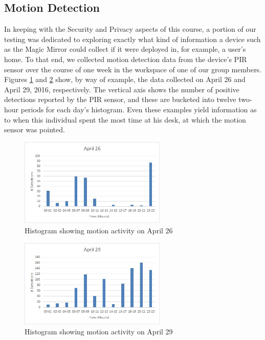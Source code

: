 \documentclass[conference]{IEEEtran}
\begin{document}
\subsection{Motion Detection}
In keeping with the Security and Privacy aspects of this course, a portion of our testing was dedicated to exploring exactly what kind of information a device such as the Magic Mirror could collect if it were deployed in, for example, a user's home.
To that end, we collected motion detection data from the device's PIR sensor over the course of one week in the workspace of one of our group members.
Figures \ref{fig:chart26} and \ref{fig:chart29} show, by way of example, the data collected on April 26 and April 29, 2016, respectively.
The vertical axis shows the number of positive detections reported by the PIR sensor, and these are bucketed into twelve two-hour periods for each day's histogram.
Even these examples yield information as to when this individual spent the most time at his desk, at which the motion sensor was pointed.
\begin{figure}[!ht]
\centering
\includegraphics[width=2.75in]{images/Chart-April26.jpg}
\caption{Histogram showing motion activity on April 26}
\label{fig:chart26}
\end{figure}

\begin{figure}[!ht]
\centering
\includegraphics[width=2.75in]{images/Chart-April29.jpg}
\caption{Histogram showing motion activity on April 29}
\label{fig:chart29}
\end{figure}
\end{document}
